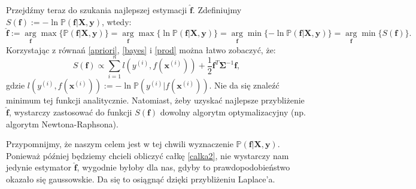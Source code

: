 \documentclass{mini}
\newcommand{\argmin}{\arg\!\min}
\newcommand{\argmax}{\arg\!\max}
\begin{document}
Przejdźmy teraz do szukania najlepszej estymacji $\mathbf{\hat{f}}$. Zdefiniujmy $S(\mathbf{f}) := -\ln\mathbb{P}(\mathbf{f}|\mathbf{X}, \mathbf{y})$, wtedy: 
$$
\mathbf{\hat{f}} 
:= \underset{\mathbf{f}}\argmax \lbrace \mathbb{P}(\mathbf{f}|\mathbf{X}, \mathbf{y}) \rbrace 
= \underset{\mathbf{f}}\argmax \lbrace \ln\mathbb{P}(\mathbf{f}|\mathbf{X}, \mathbf{y}) \rbrace
= \underset{\mathbf{f}}\argmin \lbrace -\ln\mathbb{P}(\mathbf{f}|\mathbf{X}, \mathbf{y}) \rbrace
= \underset{\mathbf{f}}\argmin \lbrace S(\mathbf{f}) \rbrace.
$$
Korzystając z równań \eqref{apriori}, \eqref{bayes} i \eqref{prod} można łatwo zobaczyć, że:
$$
S(\mathbf{f}) \propto 
\sum_{i=1}^n\textit{l}(y^{(i)}, f(\mathbf{x}^{(i)})) + \frac{1}{2}\mathbf{f}^T\mathbf{\Sigma}^{-1}\mathbf{f},
$$
gdzie $\textit{l}(y^{(i)}, f(\mathbf{x}^{(i)})) := -\ln\mathbb{P}(y^{(i)} | f(\mathbf{x}^{(i)}))$.
Nie da się znaleźć minimum tej funkcji analitycznie. Natomiast, żeby uzyskać najlepsze przybliżenie $\mathbf{\hat{f}}$, wystarczy zastosować do funkcji $S(\mathbf{f})$ dowolny algorytm optymalizacyjny (np. algorytm Newtona-Raphsona).

Przypomnijmy, że naszym celem jest w tej chwili wyznaczenie $\mathbb{P}(\mathbf{f} | \textbf{X}, \textbf{y})$. Ponieważ później będziemy chcieli obliczyć całkę \eqref{calka2}, nie wystarczy nam jedynie estymator $\mathbf{\hat{f}}$, wygodnie byłoby dla nas, gdyby to prawdopodobieństwo okazało się gaussowskie. Da się to osiągnąć dzięki przybliżeniu Laplace'a. 
\end{document}
